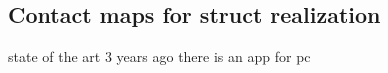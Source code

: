         
        
        
        
   
        
        

\subsection{Contact maps for struct realization}
state of the art 3 years ago
there is an app for pc
